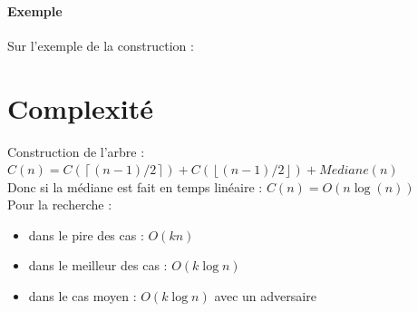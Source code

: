 \paragraph{Exemple} Sur l'exemple de la construction : \\

\section*{Complexité}

Construction de l'arbre : $C(n) = C(\left\lceil(n-1)/2\right\rceil ) + C(\left\lfloor(n-1)/2\right\rfloor ) + Mediane(n)$\\
Donc si la médiane est fait en temps linéaire : $C(n) = O(n\log(n))$\\

Pour la recherche : \begin{itemize}
	\item dans le pire des cas : $O(kn)$
	\item dans le meilleur des cas : $O(k\log n)$
	\item dans le cas moyen : $O(k\log n)$ avec un adversaire
\end{itemize}